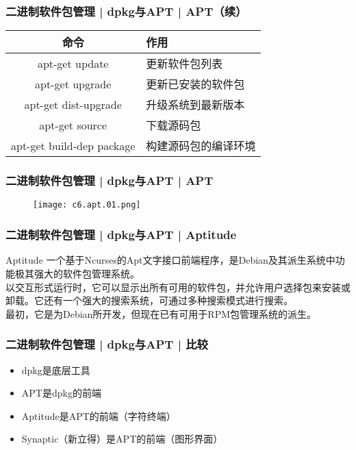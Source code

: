 \begin{frame}[fragile]
  \frametitle{二进制软件包管理 | dpkg与APT | \alert{APT（续）}}
  \begin{table}
    \centering
    \begin{tabularx}{\textwidth}{cX}
      \hline
      \rowcolor{blue!50}命令 & 作用\\
      \hline
      apt-get update & 更新软件包列表\\
      apt-get upgrade & 更新已安装的软件包\\
      apt-get dist-upgrade & 升级系统到最新版本\\
      apt-get source & 下载源码包\\
      apt-get build-dep package & 构建源码包的编译环境\\
      \hline
    \end{tabularx}
  \end{table}
\end{frame}

\begin{frame}
  \frametitle{二进制软件包管理 | dpkg与APT | APT}
  \begin{figure}
    \centering
    \texttt{[image: c6.apt.01.png]}
  \end{figure}
\end{frame}

\begin{frame}
  \frametitle{二进制软件包管理 | dpkg与APT | Aptitude}
  \begin{block}{Aptitude}
    一个基于Ncurses的Apt文字接口前端程序，是Debian及其派生系统中功能极其强大的软件包管理系统。\\
     \vspace{5pt}
    以交互形式运行时，它可以显示出所有可用的软件包，并允许用户选择包来安装或卸载。它还有一个强大的搜索系统，可通过多种搜索模式进行搜索。\\
     \vspace{5pt}
    最初，它是为Debian所开发，但现在已有可用于RPM包管理系统的派生。
  \end{block}
\end{frame}

\begin{frame}
  \frametitle{二进制软件包管理 | dpkg与APT | 比较}
  \begin{itemize}
    \item dpkg是底层工具
    \item APT是dpkg的前端
    \item Aptitude是APT的前端（字符终端）
    \item Synaptic（新立得）是APT的前端（图形界面）
  \end{itemize}
\end{frame}

